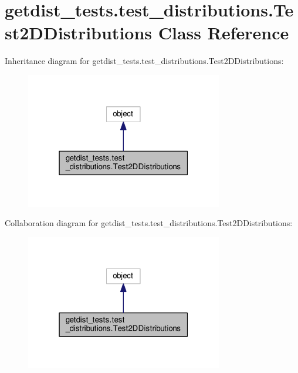 \hypertarget{classgetdist__tests_1_1test__distributions_1_1Test2DDistributions}{}\section{getdist\+\_\+tests.\+test\+\_\+distributions.\+Test2\+D\+Distributions Class Reference}
\label{classgetdist__tests_1_1test__distributions_1_1Test2DDistributions}


Inheritance diagram for getdist\+\_\+tests.\+test\+\_\+distributions.\+Test2\+D\+Distributions\+:
\nopagebreak
\begin{figure}[H]
\begin{center}
\leavevmode
\includegraphics[width=244pt]{classgetdist__tests_1_1test__distributions_1_1Test2DDistributions__inherit__graph}
\end{center}
\end{figure}


Collaboration diagram for getdist\+\_\+tests.\+test\+\_\+distributions.\+Test2\+D\+Distributions\+:
\nopagebreak
\begin{figure}[H]
\begin{center}
\leavevmode
\includegraphics[width=244pt]{classgetdist__tests_1_1test__distributions_1_1Test2DDistributions__coll__graph}
\end{center}
\end{figure}

